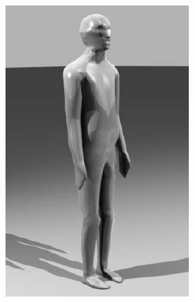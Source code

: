 \begin{figure}
\centerline{
    \hspace{1.3cm}
    \includegraphics{figures/alfred-rendered}
}
\end{figure}
